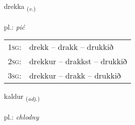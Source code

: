 \documentclass[frontgrid, backgrid]{flacards}\usepackage[]{graphicx}\usepackage[]{xcolor}
\begin{document}
\renewcommand{\blhead}{\vskip5pt {\small\bfseries\footnotesize Sagnorð | Verb }}
\renewcommand{\bcfoot}{\vskip5pt \hspace{2pt}{\small\bfseries\footnotesize 1K}}


{drekka \small{\textsubscript{(\textit{v.})}} \\[1ex] %
\textphonetic{[trɛhka]} \\
pl.: \emph{pić} \\  [2ex]
\renewcommand*{\arraystretch}{0.8}
\begin{tabular}{p{1cm}l}
\textsc{1sg}: & drekk -- drakk -- drukkið \\ 
\textsc{2sg}: & drekkur -- drakkst -- drukkið \\ 
\textsc{3sg}: & drekkur -- drakk -- drukkið \\ 
\end{tabular}
}

\renewcommand{\flhead}{\vskip5pt \fboxsep=0pt {\small\bfseries\footnotesize Lýsingarorð | Adjective}}
\renewcommand{\fcfoot}{\vskip5pt \fboxsep=0pt \hspace{2pt}{\small\bfseries\footnotesize 1K}}

\renewcommand{\blhead}{\vskip5pt {\small\bfseries\footnotesize Lýsingarorð | Adjective }}
\renewcommand{\bcfoot}{\vskip5pt \hspace{2pt}{\small\bfseries\footnotesize 1K}}


{kaldur \small{\textsubscript{(\textit{adj.})}} \\[1ex] %
\textphonetic{[kʰaltʏr]} \\
pl.: \emph{chłodny} \\  [2ex]
\renewcommand*{\arraystretch}{0.8}
}
\end{document}

